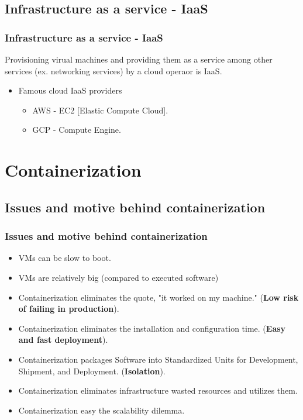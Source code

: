 \subsection{Infrastructure as a service - IaaS}
\begin{frame}
	\frametitle{Infrastructure as a service - IaaS}
	Provisioning virual machines and providing them as a service among other services (ex. networking services) by a cloud operaor is IaaS.
	\newline
	\begin{itemize}
		\item Famous cloud IaaS providers
		\begin{itemize}
			\item AWS - EC2 [Elastic Compute Cloud].
			\item GCP - Compute Engine.
		\end{itemize}
	\end{itemize}
\end{frame}

\section{Containerization}

\subsection{Issues and motive behind containerization}
\begin{frame}
	\frametitle{Issues and motive behind containerization}
	\begin{itemize}
		\item VMs can be slow to boot.
		\item VMs are relatively big (compared to executed software)
		\item Containerization eliminates the quote, "it worked on my machine." (\textbf{Low risk of failing in production}).
		\item Containerization eliminates the installation and configuration time. (\textbf{Easy and fast deployment}).
		\item Containerization packages Software into Standardized Units for Development, Shipment, and Deployment. (\textbf{Isolation}).
		\item Containerization eliminates infrastructure wasted resources and utilizes them.
		\item Containerization easy the scalability dilemma.
	\end{itemize}
\end{frame}


